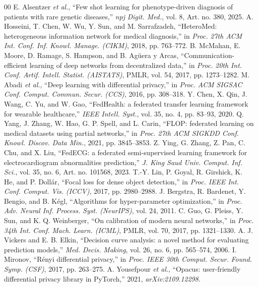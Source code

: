 \documentclass[conference]{IEEEtran}
\begin{document}
\begin{thebibliography}{00}
 E. Alsentzer \textit{et al.}, ``Few shot learning for phenotype-driven diagnosis of patients with rare genetic diseases,'' \textit{npj Digit. Med.}, vol. 8, Art. no. 380, 2025.
 A. Hosseini, T. Chen, W. Wu, Y. Sun, and M. Sarrafzadeh, ``HeteroMed: heterogeneous information network for medical diagnosis,'' in \textit{Proc. 27th ACM Int. Conf. Inf. Knowl. Manage. (CIKM)}, 2018, pp. 763--772.
 B. McMahan, E. Moore, D. Ramage, S. Hampson, and B. Ag\"{u}era y Arcas, ``Communication-efficient learning of deep networks from decentralized data,'' in \textit{Proc. 20th Int. Conf. Artif. Intell. Statist. (AISTATS)}, PMLR, vol. 54, 2017, pp. 1273--1282.
 M. Abadi \textit{et al.}, ``Deep learning with differential privacy,'' in \textit{Proc. ACM SIGSAC Conf. Comput. Commun. Secur. (CCS)}, 2016, pp. 308--318.
 Y. Chen, X. Qin, J. Wang, C. Yu, and W. Gao, ``FedHealth: a federated transfer learning framework for wearable healthcare,'' \textit{IEEE Intell. Syst.}, vol. 35, no. 4, pp. 83--93, 2020.
 Q. Yang, J. Zhang, W. Hao, G. P. Spell, and L. Carin, ``FLOP: federated learning on medical datasets using partial networks,'' in \textit{Proc. 27th ACM SIGKDD Conf. Knowl. Discov. Data Min.}, 2021, pp. 3845--3853.
 Z. Ying, G. Zhang, Z. Pan, C. Chu, and X. Liu, ``FedECG: a federated semi-supervised learning framework for electrocardiogram abnormalities prediction,'' \textit{J. King Saud Univ. Comput. Inf. Sci.}, vol. 35, no. 6, Art. no. 101568, 2023.
 T.-Y. Lin, P. Goyal, R. Girshick, K. He, and P. Doll\'ar, ``Focal loss for dense object detection,'' in \textit{Proc. IEEE Int. Conf. Comput. Vis. (ICCV)}, 2017, pp. 2980--2988.
 J. Bergstra, R. Bardenet, Y. Bengio, and B. K\'egl, ``Algorithms for hyper-parameter optimization,'' in \textit{Proc. Adv. Neural Inf. Process. Syst. (NeurIPS)}, vol. 24, 2011.
 C. Guo, G. Pleiss, Y. Sun, and K. Q. Weinberger, ``On calibration of modern neural networks,'' in \textit{Proc. 34th Int. Conf. Mach. Learn. (ICML)}, PMLR, vol. 70, 2017, pp. 1321--1330.
 A. J. Vickers and E. B. Elkin, ``Decision curve analysis: a novel method for evaluating prediction models,'' \textit{Med. Decis. Making}, vol. 26, no. 6, pp. 565--574, 2006.
 I. Mironov, ``R\'enyi differential privacy,'' in \textit{Proc. IEEE 30th Comput. Secur. Found. Symp. (CSF)}, 2017, pp. 263--275.
 A. Yousefpour \textit{et al.}, ``Opacus: user-friendly differential privacy library in PyTorch,'' 2021, \textit{arXiv:2109.12298}.

\end{thebibliography}
\end{document}
